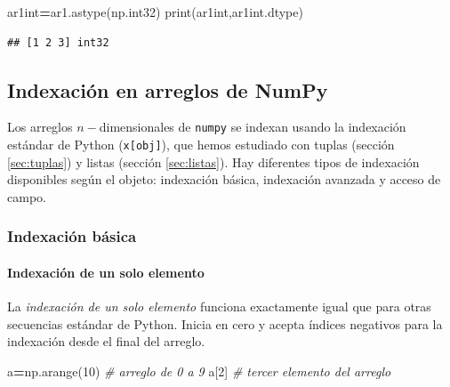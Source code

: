 \documentclass[
]{book}
\newenvironment{Shaded}{\begin{snugshade}}{\end{snugshade}}
\newcommand{\BuiltInTok}[1]{#1}
\newcommand{\CommentTok}[1]{\textcolor[rgb]{0.56,0.35,0.01}{\textit{#1}}}
\newcommand{\DecValTok}[1]{\textcolor[rgb]{0.00,0.00,0.81}{#1}}
\newcommand{\NormalTok}[1]{#1}
\newcommand{\OperatorTok}[1]{\textcolor[rgb]{0.81,0.36,0.00}{\textbf{#1}}}
\theoremstyle{definition}
\theoremstyle{definition}
\theoremstyle{definition}
\theoremstyle{definition}
\theoremstyle{remark}
\begin{document}
\begin{Shaded}
\begin{Highlighting}[]
\NormalTok{ar1int}\OperatorTok{=}\NormalTok{ar1.astype(np.int32)}
\BuiltInTok{print}\NormalTok{(ar1int,ar1int.dtype)}
\end{Highlighting}
\end{Shaded}

\begin{verbatim}
## [1 2 3] int32
\end{verbatim}

\hypertarget{indexaciuxf3n-en-arreglos-de-numpy}{%
\subsection{Indexación en arreglos de NumPy}\label{indexaciuxf3n-en-arreglos-de-numpy}}

Los arreglos \(n-\)dimensionales de \texttt{numpy} se indexan usando la indexación estándar de Python (\texttt{x{[}obj{]}}), que hemos estudiado con tuplas (sección \ref{sec:tuplas}) y listas (sección \ref{sec:listas}). Hay diferentes tipos de indexación disponibles según el objeto: indexación básica, indexación avanzada y acceso de campo.

\hypertarget{IndexacionBasica}{%
\subsubsection{Indexación básica}\label{IndexacionBasica}}

\hypertarget{indexaciuxf3n-de-un-solo-elemento}{%
\paragraph{Indexación de un solo elemento}\label{indexaciuxf3n-de-un-solo-elemento}}

La \emph{indexación de un solo elemento} funciona exactamente igual que para otras secuencias estándar de Python. Inicia en cero y acepta índices negativos para la indexación desde el final del arreglo.

\begin{Shaded}
\begin{Highlighting}[]
\NormalTok{a}\OperatorTok{=}\NormalTok{np.arange(}\DecValTok{10}\NormalTok{) }\CommentTok{\# arreglo de 0 a 9}
\NormalTok{a[}\DecValTok{2}\NormalTok{] }\CommentTok{\# tercer elemento del arreglo }
\end{Highlighting}
\end{Shaded}
\end{document}
